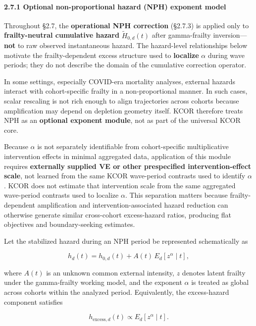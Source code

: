 \documentclass[
]{article}
\begin{document}
\paragraph{2.7.1 Optional non-proportional hazard (NPH) exponent
model}\label{optional-non-proportional-hazard-nph-exponent-model}

Throughout §2.7, the \textbf{operational NPH correction} (§2.7.3) is
applied only to \textbf{frailty-neutral cumulative hazard}
\(\tilde H_{0,d}(t)\) after gamma-frailty inversion---\textbf{not} to
raw observed instantaneous hazard. The hazard-level relationships below
motivate the frailty-dependent excess structure used to
\textbf{localize} \(\alpha\) during wave periods; they do not describe
the domain of the cumulative correction operator.

In some settings, especially COVID-era mortality analyses, external
hazards interact with cohort-specific frailty in a non-proportional
manner. In such cases, scalar rescaling is not rich enough to align
trajectories across cohorts because amplification may depend on
depletion geometry itself. KCOR therefore treats NPH as an
\textbf{optional exponent module}, not as part of the universal KCOR
core.

Because \(\alpha\) is not separately identifiable from cohort-specific
multiplicative intervention effects in minimal aggregated data,
application of this module requires \textbf{externally supplied VE or
other prespecified intervention-effect scale}, not learned from the same
KCOR wave-period contrasts used to identify \(\alpha\). KCOR does not
estimate that intervention scale from the same aggregated wave-period
contrasts used to localize \(\alpha\). This separation matters because
frailty-dependent amplification and intervention-associated hazard
reduction can otherwise generate similar cross-cohort excess-hazard
ratios, producing flat objectives and boundary-seeking estimates.

Let the stabilized hazard during an NPH period be represented
schematically as

\[
h_d(t) = h_{0,d}(t) + A(t)\,E_d[z^{\alpha}\mid t],
\]

where \(A(t)\) is an unknown common external intensity, \(z\) denotes
latent frailty under the gamma-frailty working model, and the exponent
\(\alpha\) is treated as global across cohorts within the analyzed
period. Equivalently, the excess-hazard component satisfies

\[
h_{\mathrm{excess},d}(t)\propto E_d[z^{\alpha}\mid t].
\]
\end{document}
